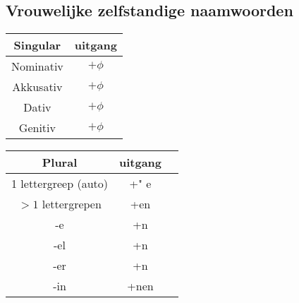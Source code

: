 \documentclass[main.tex]{subfiles}
\begin{document}
\subsection{Vrouwelijke zelfstandige naamwoorden}
\begin{minipage}[t]{0.5\textwidth}
\begin{tabular}{|c|c|}
\hline 
\rowcolor{gray}
Singular & uitgang \\ 
\hline 
\cellcolor[gray]{0.8}Nominativ & $+\phi$ \\ 
\hline 
\cellcolor[gray]{0.8}Akkusativ & $+\phi$ \\ 
\hline 
\cellcolor[gray]{0.8}Dativ & $+\phi$ \\ 
\hline 
\cellcolor[gray]{0.8}Genitiv & $+\phi$ \\ 
\hline 
\end{tabular}
\end{minipage}
\begin{minipage}[t]{0.5\textwidth}
\begin{tabular}{|c|c|c|}
\hline 
\rowcolor{gray}
Plural & uitgang \\ 
\hline 
\cellcolor[gray]{0.8}1 lettergreep (auto) & +" e \\ 
\hline 
\cellcolor[gray]{0.8} $>1$ lettergrepen & +en \\ 
\hline 
\cellcolor[gray]{0.8} -e & +n \\ 
\hline 
\cellcolor[gray]{0.8} -el & +n \\ 
\hline 
\cellcolor[gray]{0.8} -er & +n \\ 
\hline 
\cellcolor[gray]{0.8} -in & +nen \\ 
\hline 
\end{tabular} 
\end{minipage}
\end{document}
